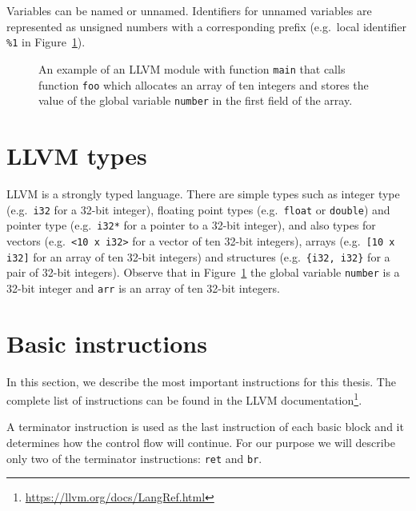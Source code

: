 Variables can be named or unnamed. Identifiers for unnamed variables are
represented as unsigned numbers with a corresponding prefix (e.g.~local
identifier \texttt{\%1} in Figure~\ref{fig:llvm_example}).

\begin{figure}[t]
 
 \caption{An example of an LLVM module with function \texttt{main} that calls
 function \texttt{foo} which allocates an array of ten integers and stores the
 value of the global variable \texttt{number} in the first field of the array.}
 \label{fig:llvm_example}
\end{figure}

\section{LLVM types}

LLVM is a strongly typed language. There are simple types such as integer type
(e.g.~\texttt{i32} for a 32-bit integer), floating point types
(e.g.~\texttt{float} or \texttt{double}) and pointer type (e.g.~\texttt{i32*}
for a pointer to a 32-bit integer), and also types for vectors
(e.g.~\texttt{<10 x i32>} for a vector of ten 32-bit integers), arrays
(e.g.~\texttt{[10 x i32]} for an array of ten 32-bit integers) and
structures (e.g.~\texttt{\{i32, i32\}} for a pair of 32-bit integers).
Observe that in Figure~\ref{fig:llvm_example} the global variable
\texttt{number} is a 32-bit integer and \texttt{arr} is an array of ten
32-bit integers.

\section{Basic instructions}

In this section, we describe the most important instructions for this thesis. The
complete list of instructions can be found in the LLVM
documentation\footnote{\url{https://llvm.org/docs/LangRef.html}}.

A terminator instruction is used as the last instruction of each basic block
and it determines how the control flow will continue. For our purpose we will
describe only two of the terminator instructions: \texttt{ret} and \texttt{br}.

